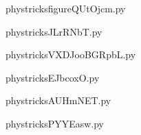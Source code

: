     \newcommand{\CaptionFigfigureQUtOjcm}{<+Type your caption here+>}
    \begin{center}
        
    \end{center}
    phystricksfigureQUtOjcm.py

    

    \clearpage
    


    \newcommand{\CaptionFigJLrRNbT}{<+Type your caption here+>}
    \begin{center}
        
    \end{center}
    phystricksJLrRNbT.py

    

    \clearpage
    


    \newcommand{\CaptionFigVXDJooBGRpbL}{<+Type your caption here+>}
    \begin{center}
        
    \end{center}
    phystricksVXDJooBGRpbL.py

    

    \clearpage
    


    \newcommand{\CaptionFigEJbcoxO}{<+Type your caption here+>}
    \begin{center}
        
    \end{center}
    phystricksEJbcoxO.py

    

    \clearpage
    


    \newcommand{\CaptionFigAUHmNET}{<+Type your caption here+>}
    \begin{center}
        
    \end{center}
    phystricksAUHmNET.py

    

    \clearpage
    


    \newcommand{\CaptionFigPYYEasw}{<+Type your caption here+>}
    \begin{center}
        
    \end{center}
    phystricksPYYEasw.py


